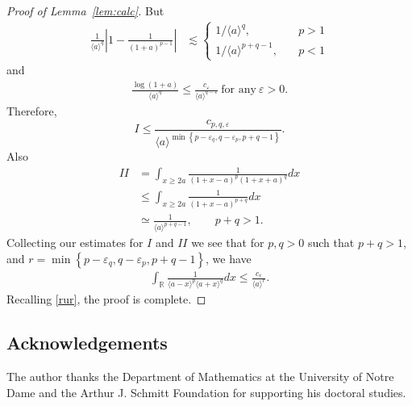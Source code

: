 \documentclass[12pt,reqno]{amsart}
\numberwithin{equation}{section}  %
\numberwithin{figure}{section}
\newcommand{\rr}{\mathbb{R}}
\newcommand{\ee}{\varepsilon}
\begin{document}
\begin{proof}[Proof of Lemma~\ref{lem:calc}]
%
But
%
%
\begin{equation*}
\begin{split}
\frac{1}{\langle a \rangle ^{q}}\left| 1 - \frac{1}{(1 +
a)^{p -1}} \right|
& \lesssim
\begin{cases}
1/{\langle a \rangle ^{q}}, \quad & p > 1
\\
1/{\langle a \rangle ^{p + q -1}}, \quad & p < 1
\end{cases}
\end{split}
\end{equation*}
%
%
and
%
%
\begin{equation*}
\begin{split}
\frac{\log(1 + a)}{\langle a \rangle^{q} } \le  \frac{c_{\ee}}{\langle a
\rangle ^{q - \ee}} \ \text{for any} \ \ee > 0.
\end{split}
\end{equation*}
%
%
%
Therefore,
\begin{equation*}
I \le  \frac{c_{p,q, \ee}}{\langle a \rangle ^{\min\left\{ p-\ee_{q}, q -\ee_{p}, p + q-1 \right\}}}.
\end{equation*}
%
%
Also
%
%
\begin{equation*}
\begin{split}
II 
& = \int_{x \ge 2a} \frac{1}{(1 + x - a)^{p} (1 + x +
a)^{q}} d x
\\
& \le \int_{x \ge 2a} \frac{1}{(1 + x -a)^{p+q}} d x
\\
& \simeq \frac{1}{\langle a \rangle^{p+q -1}}, \qquad p + q > 1.
\end{split}
\end{equation*}
%
%
Collecting our estimates for $I$ and $II$ we see that for 
$p, q > 0$ such that $p +q >1$, and $r =\min\left\{p -\ee_{q}, q - \ee_{p}, p+q-1
\right\}$, we have
\begin{align*}
\int_{\rr} \frac{1}{\langle a - x \rangle ^{p} \langle a + x \rangle
^{q}} d x
\le \frac{c_{r}}{\langle a \rangle ^{r}}.
\label{est-2}
\end{align*}
Recalling \eqref{rur}, the proof is complete.
\end{proof}
%
%
\subsection*{Acknowledgements} The author
thanks the Department of Mathematics at the University of Notre Dame and
the Arthur J. Schmitt Foundation for supporting his doctoral studies.
%
%


\end{document}
